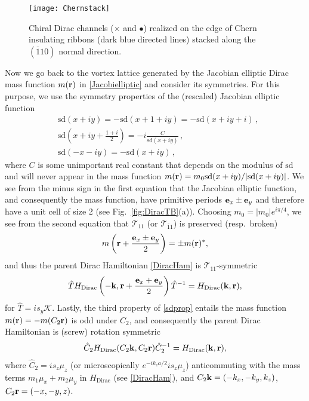 \begin{figure}[htbp]
	\centering\texttt{[image: Chernstack]}
	\caption[Chiral Dirac channels realized on the edge of Chern insulating ribbons.]{Chiral Dirac channels ({\color{red}$\boldsymbol\times$} and {\color{green}$\bullet$}) realized on the edge of Chern insulating ribbons (dark blue directed lines) stacked along the $(\bar{1}10)$ normal direction.}\label{fig:Chernstack}
\end{figure}

Now we go back to the vortex lattice generated by the Jacobian elliptic Dirac mass function $m({\bf r})$ in \eqref{Jacobielliptic} and consider its symmetries. For this purpose, we use the symmetry properties of the (rescaled) Jacobian elliptic function~\cite{ReinhardtWalker10} \begin{align}&\mathrm{sd}(x+iy)=-\mathrm{sd}(x+1+iy)=-\mathrm{sd}(x+iy+i)\nonumber \,, \\&\mathrm{sd}\left(x+iy+\frac{1+i}{2}\right)=-i\frac{C}{\mathrm{sd}(x+iy)}\label{sdprop} \,, \\&\mathrm{sd}(-x-iy)=-\mathrm{sd}(x+iy)\nonumber \,,\end{align} where $C$ is some unimportant real constant that depends on the modulus of $\mathrm{sd}$ and will never appear in the mass function $m({\bf r})=m_0\mathrm{sd}(x+iy)/|\mathrm{sd}(x+iy)|$. We see from the minus sign in the first equation that the Jacobian elliptic function, and consequently the mass function, have primitive periods ${\bf e}_x\pm{\bf e}_y$ and therefore have a unit cell of size 2 (see Fig.~\ref{fig:DiracTB}(a)). Choosing $m_0=|m_0|e^{i\pi/4}$, we see from the second equation that $\mathcal{T}_{11}$ (or $\mathcal{T}_{\bar{1}1}$) is preserved (resp.~broken) \begin{align}m\left({\bf r}+\frac{{\bf e}_x\pm{\bf e}_y}{2}\right)=\pm m({\bf r})^\ast,\label{massT11}\end{align} and thus the parent Dirac Hamiltonian \eqref{DiracHam} is $\mathcal{T}_{11}$-symmetric \begin{align}\hat{T}H_{\mathrm{Dirac}}\left(-{\bf k},{\bf r}+\frac{{\bf e}_x+{\bf e}_y}{2}\right)\hat{T}^{-1}=H_{\mathrm{Dirac}}({\bf k},{\bf r}),\end{align} for $\hat{T}=is_y\mathcal{K}$. Lastly, the third property of \eqref{sdprop} entails the mass function $m({\bf r})=-m(C_2{\bf r})$ is odd under $C_2$, and consequently the parent Dirac Hamiltonian is (screw) rotation symmetric \begin{align}\hat{C}_2H_{\mathrm{Dirac}}(C_2{\bf k},C_2{\bf r})\hat{C}_2^{-1}=H_{\mathrm{Dirac}}({\bf k},{\bf r}),\label{massC2}\end{align} where $\hat{C}_2=is_z\mu_z$ (or microscopically $e^{-ik_za/2}is_z\mu_z$) anticommuting with the mass terms $m_1\mu_x+m_2\mu_y$ in $H_{\mathrm{Dirac}}$ (see \eqref{DiracHam}), and $C_2{\bf k}=(-k_x,-k_y,k_z)$, $C_2{\bf r}=(-x,-y,z)$.

